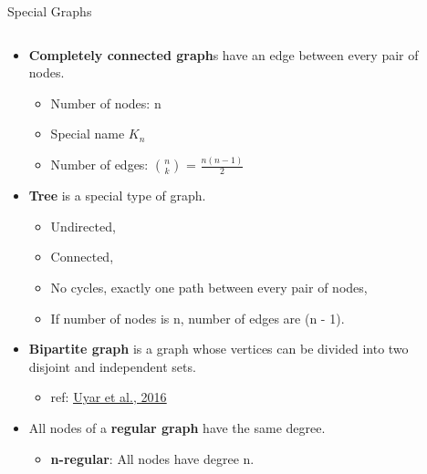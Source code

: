 \documentclass[aspectratio=169]{beamer}%
\begin{document}
\begin{frame}{Special Graphs}%
    \begin{columns}[T]%
        \begin{column}{.66\textwidth}%
            \begin{itemize}
            \item \textbf{Completely connected graph}s have an edge between every pair of nodes.
                \begin{itemize}
                    \item Number of nodes: n
                    \item Special name $K_n$                
                    \item Number of edges: $\binom{n}{k}$ = $\frac{n(n-1)}{2}$                    
                \end{itemize}
            \item \textbf{Tree} is a special type of graph.
                \begin{itemize}
                    \item Undirected,
                    \item Connected,
                    \item No cycles, exactly one path between every pair of nodes,
                    \item If number of nodes is n, number of edges are (n - 1).
                \end{itemize}
            \item \textbf{Bipartite graph} is a graph whose vertices can be divided into two disjoint and independent sets.
                \begin{itemize}
                    \item ref: \href{https://ninova.itu.edu.tr/tr/dersler/bilgisayar-bilisim-fakultesi/142/blg-112/ekkaynaklar?g118771}{\underline{Uyar et al., 2016}}
                \end{itemize}
            \item All nodes of a \textbf{regular graph} have the same degree.
                \begin{itemize}
                    \item \textbf{n-regular}: All nodes have degree n.
                \end{itemize}
            \end{itemize}
        \end{column}%
        \hfill
        \begin{column}{.30\textwidth}%

\end{column}
\end{columns}
\end{frame}
\end{document}
